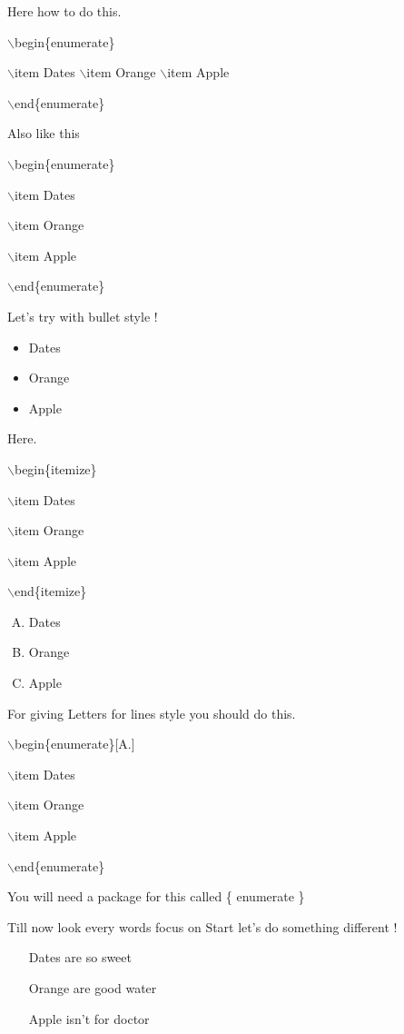 \documentclass[11pt]{article}
\begin{document}
Here how to do this.

$\backslash$begin\{enumerate\}

$\backslash$item Dates
$\backslash$item Orange
$\backslash$item Apple

$\backslash$end\{enumerate\}

Also like this

$\backslash$begin\{enumerate\}

$\backslash$item Dates

$\backslash$item Orange

$\backslash$item Apple

$\backslash$end\{enumerate\}

Let's try with bullet style !

\begin{itemize}
\item Dates \item Orange \item Apple
\end{itemize}

Here.

$\backslash$begin\{itemize\}

$\backslash$item Dates

$\backslash$item Orange

$\backslash$item Apple

$\backslash$end\{itemize\}


\begin{enumerate}[A.]
\item Dates
\item Orange 
\item Apple
\end{enumerate}

For giving Letters for lines style you should do this.

$\backslash$begin\{enumerate\}[A.]

$\backslash$item Dates

$\backslash$item Orange

$\backslash$item Apple

$\backslash$end\{enumerate\}

You will need a package for this called \{ enumerate \}

\pagebreak

Till now look every words focus on Start let's do something different !

\begin{enumerate}
\item[Dates are so sweet]
\item[Orange are good water]
\item[Apple isn't for doctor]
\end{enumerate}
\end{document}
